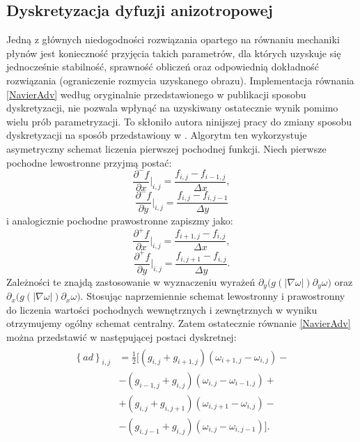 \documentclass[a4paper,12pt,twoside,openany]{report}
\begin{document}
\subsection{Dyskretyzacja dyfuzji anizotropowej}
\label{ssec:anisModNS}
Jedną z głównych niedogodności rozwiązania opartego na równaniu mechaniki płynów jest konieczność przyjęcia takich parametrów, dla których uzyskuje się jednocześnie stabilność, sprawność obliczeń oraz odpowiednią dokładność rozwiązania (ograniczenie rozmycia uzyskanego obrazu). Implementacja równania \eqref{NavierAdv} według oryginalnie przedstawionego w publikacji \cite{au2001image} sposobu dyskretyzacji, nie pozwala wpłynąć na uzyskiwany ostatecznie wynik pomimo wielu prób parametryzacji. To skłoniło autora ninijszej pracy do zmiany sposobu dyskretyzacji na sposób przedstawiony w \cite{van2005algorithms}. Algorytm ten wykorzystuje asymetryczny schemat liczenia pierwszej pochodnej funkcji. Niech pierwsze pochodne lewostronne przyjmą postać:
\begin{equation}
\frac{\partial^-f}{\partial x}\bigg|_{i,j}=\frac{f_{i,j}-f_{i-1,j}}{\Delta x}
\label{leftdfdx}
,
\end{equation}
\begin{equation}
{\frac{{\partial }^-f}{\partial y}}\bigg|_{i,j}=\frac{f_{i,j}-f_{i,j-1}}{\Delta y}
\label{leftdfdy}
\end{equation}
i analogicznie pochodne prawostronne zapiszmy jako:
\begin{equation}
{\frac{{\partial }^+f}{\partial x}}\bigg|_{i,j}=\frac{f_{i+1,j}-f_{i,j}}{\Delta x} 
\label{rightdfdx}
,
\end{equation}
\begin{equation}
{\frac{{\partial }^+f}{\partial y}}\bigg|_{i,j}=\frac{f_{i,j+1}-f_{i,j}}{\Delta y}
\label{rightdfdy}
.
\end{equation}
Zależności te znajdą zastosowanie w wyznaczeniu wyrażeń
${\partial }_y \Big(g\left(\left|\nabla \omega \right|\right){\partial }_y\omega \Big)$ oraz
${\partial }_x\Big(g\left(\left|\nabla \omega \right|\right){\partial }_x\omega \Big)$. Stosując naprzemiennie schemat lewostronny i prawostronny do liczenia wartości pochodnych wewnętrznych i zewnętrznych w wyniku otrzymujemy ogólny schemat centralny. Zatem ostatecznie równanie \eqref{NavierAdv} można przedstawić w następującej postaci dyskretnej:
\begin{align}
\begin{aligned}
{\left\{ad\right\}}_{i,j}
&= \frac{1}{2}\biggl[\left(g_{i,j}+g_{i+1,j}\right)\left({\omega }_{i+1,j}-{\omega }_{i,j}\right) -\\[1ex]
&- \left(g_{i-1,j}+g_{i,j}\right)\left({\omega }_{i,j}-{\omega }_{i-1,j}\right) +  \\[1ex]
&+ \left(g_{i,j}+g_{i,j+1}\right)\left({\omega }_{i,j+1}-{\omega }_{i,j}\right) -\\[1ex]
&- \left(g_{i,j-1}+g_{i,j}\right)\left({\omega }_{i,j}-{\omega }_{i,j-1}\right)\biggl].
\end{aligned}
\label{discreteAnisotropic2}
\end{align}
\end{document}
